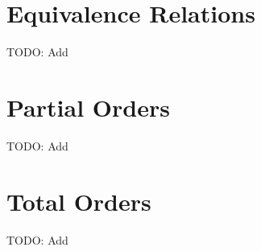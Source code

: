 
\section{Equivalence Relations}
TODO: Add


\section{Partial Orders}  %
TODO: Add


\section{Total Orders}  %
TODO: Add

